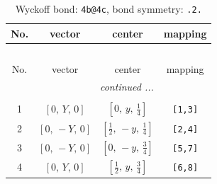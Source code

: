 \documentclass[fleqn,8pt]{jsarticle}
\begin{document}
\renewcommand{\arraystretch}{1.2}
\begin{longtable}{cccc}
\caption{Wyckoff bond: {\tt 4b@4c}, bond symmetry: {\tt .2.}}
 \\
 \hline \hline
No. & vector & center & mapping \\ \hline \endfirsthead

\multicolumn{3}{l}{\tablename\ \thetable{}} \\
 \hline \hline
No. & vector & center & mapping \\ \hline \endhead

 \hline \hline
\multicolumn{3}{r}{\footnotesize\it continued ...} \\ \endfoot

 \hline \hline
\multicolumn{3}{r}{} \\ \endlastfoot

1 & $\left[ 0,\, Y,\, 0 \right]$ & $\left[ 0,\, y,\, \frac{1}{4} \right]$ & {\tt [1,3]} \\ \hline
2 & $\left[ 0,\, - Y,\, 0 \right]$ & $\left[ \frac{1}{2},\, - y,\, \frac{1}{4} \right]$ & {\tt [2,4]} \\ \hline
3 & $\left[ 0,\, - Y,\, 0 \right]$ & $\left[ 0,\, - y,\, \frac{3}{4} \right]$ & {\tt [5,7]} \\ \hline
4 & $\left[ 0,\, Y,\, 0 \right]$ & $\left[ \frac{1}{2},\, y,\, \frac{3}{4} \right]$ & {\tt [6,8]} \\
\end{longtable}
\renewcommand{\arraystretch}{1.2}
\end{document}
